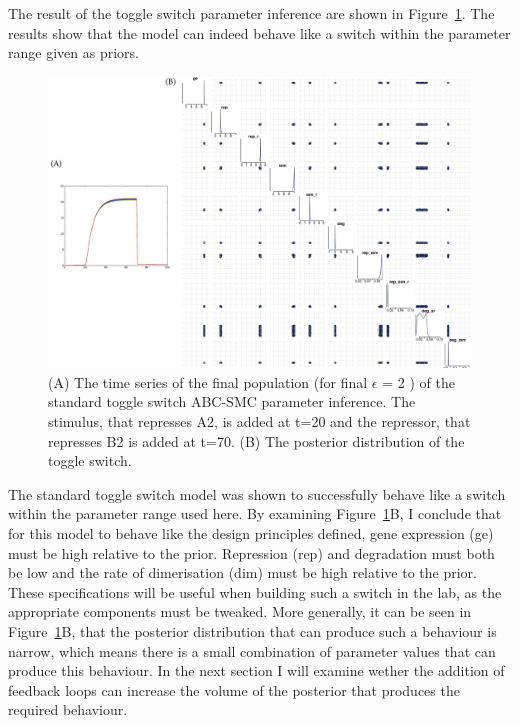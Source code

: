 The result of the toggle switch parameter inference are shown in Figure~\ref{fig:stand_abc_timeseries}. The results show that the model can indeed behave like a switch within the parameter range given as priors. 

\begin{figure}[htbp]
    \centering
    \hspace*{-1cm}
    \includegraphics[scale=0.7]{../../chapters/chapterABCSysBio/images/param_inf_res.png}
    \caption{(A) The time series of the final population (for final $\epsilon$ = 2 ) of the standard toggle switch ABC-SMC parameter inference. The stimulus, that represses A2, is added at t=20 and the repressor, that represses B2 is added at t=70. (B) The posterior distribution of the toggle switch.}
    \label{fig:stand_abc_timeseries}
\end{figure}
\clearpage
    

The standard toggle switch model was shown to successfully behave like a switch within the parameter range used here.  By examining Figure~\ref{fig:stand_abc_timeseries}B, I conclude that for this model to behave like the design principles defined, gene expression (ge) must be high relative to the prior. Repression (rep) and degradation must both be low and the rate of dimerisation (dim) must be high relative to the prior. These specifications will be useful when building such a switch in the lab, as the appropriate components must be tweaked. More generally, it can be seen in Figure~\ref{fig:stand_abc_timeseries}B, that the posterior distribution that can produce such a behaviour is narrow, which means there is a small combination of parameter values that can produce this behaviour. In the next section I will examine wether the addition of feedback loops can increase the volume of the posterior that produces the required behaviour.


